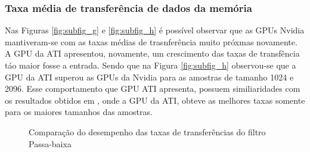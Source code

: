 \subsubsection{Taxa média de transferência de dados da memória}
Nas Figuras \ref{fig:subfig_g} e \ref{fig:subfig_h} é possível observar que as GPUs Nvidia mantiveram-se com as taxas médias de trasnferência muito próxmas novamente. A GPU da ATI apresentou, novamente, um crescimento das taxas de transfência táo maior fosse a entrada. Sendo que na Figura \ref{fig:subfig_h} observou-se que a GPU da ATI superou as GPUs da Nvidia para as amostras de tamanho 1024 e 2096. Esse comportamento que GPU ATI apresenta, possuem similiaridades com os resultados obtidos em \cite{ArchComp}, onde a GPU da ATI, obteve as melhores taxas somente para os maiores tamanhos das amostras.
\begin{figure}[!ht]
\centering
{}
\label{fig:subfiguras}
\caption{Comparação do desempenho das taxas de transferências do filtro Passa-baixa}
\end{figure}
\FloatBarrier


\newpage
\appendix

